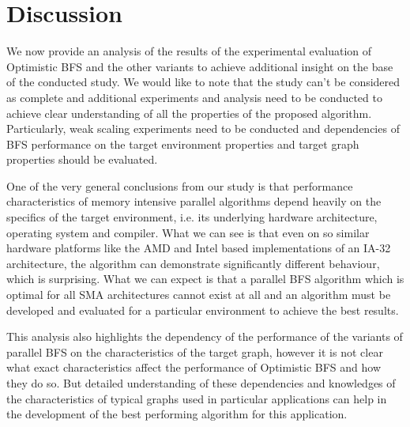 \documentclass[letterpaper]{article}
\begin{document}
	\section{Discussion}\label{sec:disc} %
		We now provide an analysis of the results of the experimental evaluation of Optimistic BFS and the other variants to achieve additional insight on the base of the conducted study.
		We would like to note that the study can't be considered as complete and additional experiments and analysis need to be conducted to achieve clear understanding of all the properties of the proposed algorithm.  
		Particularly, weak scaling experiments need to be conducted and dependencies of BFS performance on the target environment properties and target graph properties should be evaluated. 
		
		One of the very general conclusions from our study is that performance characteristics of memory intensive parallel algorithms depend heavily on the specifics of the target environment, i.e. its underlying hardware architecture, operating system and compiler.
		What we can see is that even on so similar hardware platforms like the AMD and Intel based implementations of an IA-32 architecture, the algorithm can demonstrate significantly different behaviour, which is surprising.
		What we can expect is that a parallel BFS algorithm which is optimal for all SMA architectures cannot exist at all and an algorithm must be developed and evaluated for a particular environment to achieve the best results.
		
		This analysis also highlights the dependency of the performance of the variants of parallel BFS on the characteristics of the target graph, however it is not clear what exact characteristics affect the performance of Optimistic BFS and how they do so. 
		But detailed understanding of these dependencies and knowledges of the characteristics of typical graphs used in particular applications can help in the development of the best performing algorithm for this application.
		
\end{document}
